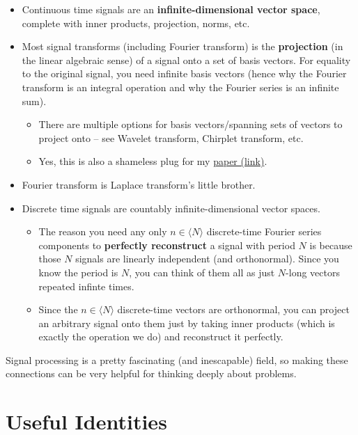 \documentclass[a4paper,12pt]{report}
\begin{document}
\begin{itemize}
\item Continuous time signals are an \textbf{infinite-dimensional vector space}, complete with inner products, projection, norms, etc.
\item Most signal transforms (including Fourier transform) is the \textbf{projection} (in the linear algebraic sense) of a signal onto a set of basis vectors. For equality to the original signal, you need infinite basis vectors (hence why the Fourier transform is an integral operation and why the Fourier series is an infinite sum).
\begin{itemize}
\item There are multiple options for basis vectors/spanning sets of vectors to project onto -- see Wavelet transform, Chirplet transform, etc.
\item Yes, this is also a shameless plug for my \href{https://archive.org/details/bhargava-a-4-margins-adaptive-chirplet-transform-based-machine-learning-for-p-30}{paper (link)}.
\end{itemize}
\item Fourier transform is Laplace transform's little brother.
\item Discrete time signals are countably infinite-dimensional vector spaces. 
\begin{itemize}
\item The reason you need any only $n\in \langle N \rangle$ discrete-time Fourier series components to \textbf{perfectly reconstruct} a signal with period $N$ is because those $N$ signals are linearly independent (and orthonormal). Since you know the period is $N$, you can think of them all as just $N$-long vectors repeated infinte times. 
\item Since the $n\in \langle N \rangle$ discrete-time vectors are orthonormal, you can project an arbitrary signal onto them just by taking inner products (which is exactly the operation we do) and reconstruct it perfectly. 
\end{itemize}
\end{itemize}

Signal processing is a pretty fascinating (and inescapable) field, so making these connections can be very helpful for thinking deeply about problems. 


\section{Useful Identities}
\end{document}

